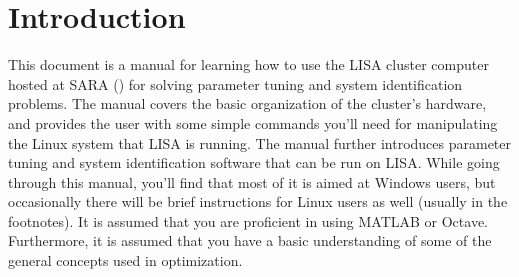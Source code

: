 \chapter{Introduction}
\label{ch:introduction}


This document is a manual for learning how to use the LISA cluster computer hosted at SARA () for solving parameter tuning and system identification problems. The manual covers the basic organization of the cluster's hardware, and provides the user with some simple commands you'll need for manipulating the Linux system that LISA is running. The manual further introduces parameter tuning and system identification software that can be run on LISA. While going through this manual, you'll find that most of it is aimed at Windows users, but occasionally there will be brief instructions for Linux users as well (usually in the footnotes). It is assumed that you are proficient in using MATLAB or Octave. Furthermore, it is assumed that you have a basic understanding of some of the general concepts used in optimization.

\setcounter{smallqcounter}{0}
